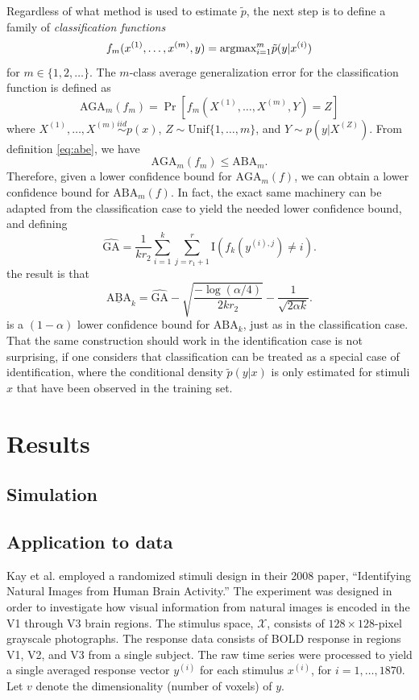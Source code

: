 \documentclass[12pt]{article}
\begin{document}
Regardless of what method is used to estimate $\tilde{p}$, the next
step is to define a family of \emph{classification functions}
\[
f_m(x^{(1)},\hdots, x^{(m)}, y) = \text{argmax}_{i=1}^m \tilde{p}(y|x^{(i)})
\]
for $m \in \{1,2,\hdots\}$.
The $m$-class average generalization error for the classification function is defined as
\[
\text{AGA}_m(f_m) = \Pr[f_m(X^{(1)},\hdots, X^{(m)}, Y) = Z]
\]
where $X^{(1)},\hdots, X^{(m)} \stackrel{iid}{\sim} p(x)$,
$Z \sim \text{Unif}\{1,\hdots, m\}$, and $Y \sim p(y|X^{(Z)})$.
From definition \eqref{eq:abe}, we have
\[
\text{AGA}_m(f_m) \leq \text{ABA}_m.
\]
Therefore, given a lower confidence bound for $\text{AGA}_m(f)$, we
can obtain a lower confidence bound for $\text{ABA}_m(f)$.  In fact,
the exact same machinery can be adapted from the classification case
to yield the needed lower confidence bound, and defining
\[
\widehat{\text{GA}} = \frac{1}{k r_2} \sum_{i=1}^k \sum_{j = r_1 + 1}^r \text{I}(f_k(y^{(i),j}) \neq i).
\]
the result is that
\[
\underline{\text{ABA}}_k = \widehat{\text{GA}} - \sqrt{\frac{-\log(\alpha/4)}{2kr_2}} - \frac{1}{\sqrt{2\alpha k}}.
\]
is a $(1-\alpha)$ lower confidence bound for $\text{ABA}_k$, just as
in the classification case.  That the same construction should work in
the identification case is not surprising, if one considers that
classification can be treated as a special case of identification,
where the conditional density $\tilde{p}(y|x)$ is only estimated for
stimuli $x$ that have been observed in the training set.

\section{Results}

\subsection{Simulation}

\subsection{Application to data}

Kay et al. employed a randomized stimuli design in their 2008 paper,
``Identifying Natural Images from Human Brain Activity.''  The
experiment was designed in order to investigate how visual information
from natural images is encoded in the V1 through V3 brain regions.
The stimulus space, $\mathcal{X}$, consists of $128 \times 128$-pixel
grayscale photographs.  The response data consists of BOLD response in
regions V1, V2, and V3 from a single subject.  The raw time series were
processed to yield a single averaged response vector $y^{(i)}$ for each
stimulus $x^{(i)}$, for $i = 1,\hdots, 1870$.
Let $v$ denote the dimensionality (number of voxels) of $y$.
\end{document}
